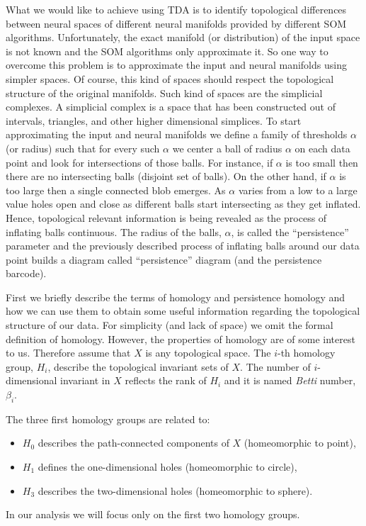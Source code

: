 \documentclass[10pt]{article}
\theoremstyle{definition}
\begin{document}
What we would like to achieve using TDA is to identify topological differences 
between neural spaces of different neural manifolds provided by different
SOM algorithms. Unfortunately, the exact manifold (or distribution) of the
input space is not known and the SOM algorithms only approximate it. So one 
way to overcome this problem is to approximate the input and neural manifolds
using simpler spaces. Of course, this kind of spaces should respect the
topological structure of the original manifolds. Such kind of spaces are the
simplicial complexes. A simplicial complex is a space that has been constructed
out of intervals, triangles, and other higher dimensional simplices. To start
approximating the input and neural manifolds we define a family of thresholds
$\alpha$ (or radius) such that for every such $\alpha$ we center a ball of
radius $\alpha$ on each data point and look for intersections of those balls.
For instance, if $\alpha$ is too small then there are no intersecting balls 
(disjoint set of balls). On the other hand, if $\alpha$ is too large then 
a single connected blob emerges. As $\alpha$ varies from a low to a large 
value holes open and close as different balls start intersecting as they 
get inflated. Hence, topological relevant information is being revealed as 
the process of inflating balls continuous. The radius of the balls,
$\alpha$, is called the ``persistence'' parameter and the previously described 
process of inflating balls around our data point builds a diagram 
called ``persistence'' diagram (and the persistence barcode). 


First we briefly describe the terms of homology and persistence homology and 
how we can use them to obtain some useful information regarding the topological
structure of our data. For simplicity (and lack of space) we omit the formal
definition of homology. However, the properties of homology are of some
interest to us. Therefore assume that $X$ is any topological space. The $i$-th
homology group, $H_i$, describe the topological invariant sets of $X$. The 
number of $i$-dimensional invariant in $X$ reflects the rank of $H_i$ and
it is named \emph{Betti} number, $\beta_i$.

The
three first homology groups are related to:
\begin{itemize}
    \item $H_0$ describes the path-connected components of $X$ (homeomorphic to
        point),
    \item $H_1$ defines the one-dimensional holes (homeomorphic to circle),
    \item $H_3$ describes the two-dimensional holes (homeomorphic to sphere).
\end{itemize}
In our analysis we will focus only on the first two homology groups. 
\end{document}
